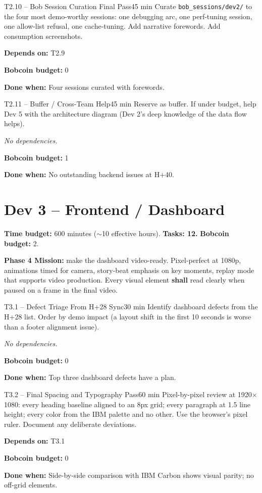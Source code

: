 \documentclass[11pt,letterpaper]{article}
\newcommand{\acceptance}[1]{\par\smallskip\textcolor{ibmgreen}{\textbf{Done when:}} #1}
\newcommand{\depends}[1]{\par\smallskip\textcolor{ibmorange}{\textbf{Depends on:}} #1}
\newcommand{\nodep}{\par\smallskip\textcolor{ibmgray}{\textit{No dependencies.}}}
\newcommand{\bobcost}[1]{\par\smallskip\textcolor{ibmaccent}{\textbf{Bobcoin budget:}} #1}
\newcommand{\shall}{\textbf{shall}}
\begin{document}
\begin{task}{T2.10 -- Bob Session Curation Final Pass}{45 min}
Curate \texttt{bob\_sessions/dev2/} to the four most demo-worthy sessions: one debugging arc, one perf-tuning session, one allow-list refusal, one cache-tuning. Add narrative forewords. Add consumption screenshots.
\depends{T2.9}
\bobcost{0}
\acceptance{Four sessions curated with forewords.}
\end{task}

\begin{task}{T2.11 -- Buffer / Cross-Team Help}{45 min}
Reserve as buffer. If under budget, help Dev 5 with the architecture diagram (Dev 2's deep knowledge of the data flow helps).
\nodep
\bobcost{1}
\acceptance{No outstanding backend issues at H+40.}
\end{task}

\section{Dev 3 -- Frontend / Dashboard}

\textbf{Time budget:} 600 minutes (${\sim}$10 effective hours). \textbf{Tasks: 12.} \textbf{Bobcoin budget:} 2.

\textbf{Phase 4 Mission:} make the dashboard video-ready. Pixel-perfect at 1080p, animations timed for camera, story-beat emphasis on key moments, replay mode that supports video production. Every visual element \shall{} read clearly when paused on a frame in the final video.

\begin{task}{T3.1 -- Defect Triage From H+28 Sync}{30 min}
Identify dashboard defects from the H+28 list. Order by demo impact (a layout shift in the first 10 seconds is worse than a footer alignment issue).
\nodep
\bobcost{0}
\acceptance{Top three dashboard defects have a plan.}
\end{task}

\begin{task}{T3.2 -- Final Spacing and Typography Pass}{60 min}
Pixel-by-pixel review at 1920$\times$1080: every heading baseline aligned to an 8px grid; every paragraph at 1.5 line height; every color from the IBM palette and no other. Use the browser's pixel ruler. Document any deliberate deviations.
\depends{T3.1}
\bobcost{0}
\acceptance{Side-by-side comparison with IBM Carbon shows visual parity; no off-grid elements.}
\end{task}
\end{document}

